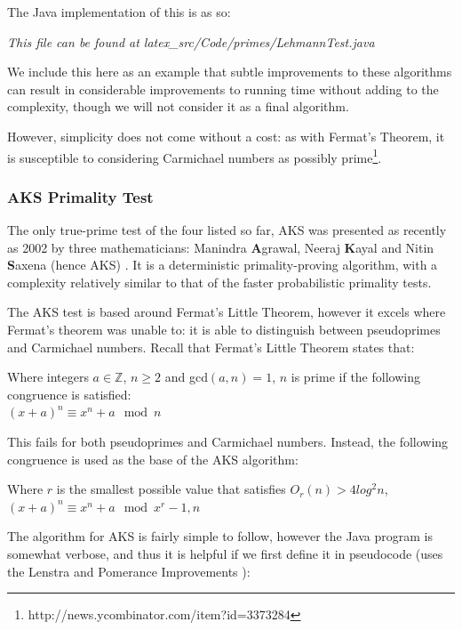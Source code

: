     The Java implementation of this is as so:
    
    \emph{This file can be found at latex\_src/Code/primes/LehmannTest.java}
    
    We include this here as an example that subtle improvements to these algorithms can result in considerable improvements to running time\cite{Kendal:2012rt} without adding to the complexity, though we will not consider it as a final algorithm.
    
    However, simplicity does not come without a cost: as with Fermat's Theorem, it is susceptible to considering Carmichael numbers as possibly prime\footnote{http://news.ycombinator.com/item?id=3373284}.
    
    \subsubsection{AKS Primality Test}
    
    The only true-prime test of the four listed so far, AKS was presented as recently as 2002 by three mathematicians: Manindra \textbf{A}grawal, Neeraj \textbf{K}ayal and Nitin \textbf{S}axena (hence AKS) \cite{Agrawal:2002aa}. It is a deterministic primality-proving algorithm, with a complexity relatively similar to that of the faster probabilistic primality tests.
    
    The AKS test is based around Fermat's Little Theorem, however it excels where Fermat's theorem was unable to: it is able to distinguish between pseudoprimes and Carmichael numbers. Recall that Fermat's Little Theorem states that: 
    
    \begin{mathfact}
      Where integers $a \in \mathbb{Z}$, $n \geq 2$ and gcd$(a,n)=1$, $n$ is prime if the following congruence is satisfied: \\
      $(x+a)^n \equiv x^n + a \mod{n}$ 
    \end{mathfact}
    
    This fails for both pseudoprimes and Carmichael numbers. Instead, the following congruence is used as the base of the AKS algorithm: 
    
    \begin{mathdef}
      Where $r$ is the smallest possible value that satisfies $O_r(n) > 4log^2n$,\\
       $(x+a)^n \equiv x^n + a \mod{x^r -1, n}$ 
    \end{mathdef}
    
    The algorithm for AKS is fairly simple to follow, however the Java program is somewhat verbose, and thus it is helpful if we first define it in pseudocode (uses the Lenstra and Pomerance Improvements \cite{Salembier:2005aa}):
    
